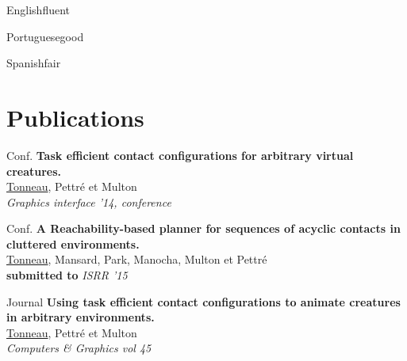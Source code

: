 \documentclass{tccv}
\begin{document}
\begin{factlist}
\item{English}{fluent}
\item{Portuguese}{good}
\item{Spanish}{fair}
\end{factlist}

\section{Publications}
\begin{factlist}

\item{Conf.} 
     {\textbf{Task efficient contact configurations for 
arbitrary virtual creatures.} \\
\underline{Tonneau}, Pettr\'e et Multon \\
\textit{Graphics interface ’14, conference }
}

\item{Conf.} 
     {\textbf{A Reachability-based planner for sequences
of acyclic contacts in cluttered environments.} \\
\underline{Tonneau}, Mansard, Park, Manocha, Multon et Pettr\'e\\
\textbf{submitted to} \textit{ISRR '15}
}


\item{Journal} 
     {\textbf{Using task efficient contact configurations to animate 
creatures in arbitrary environments.} \\
\underline{Tonneau}, Pettr\'e et Multon \\
\textit{Computers \& Graphics vol 45}
}

\end{factlist}
\end{document}
